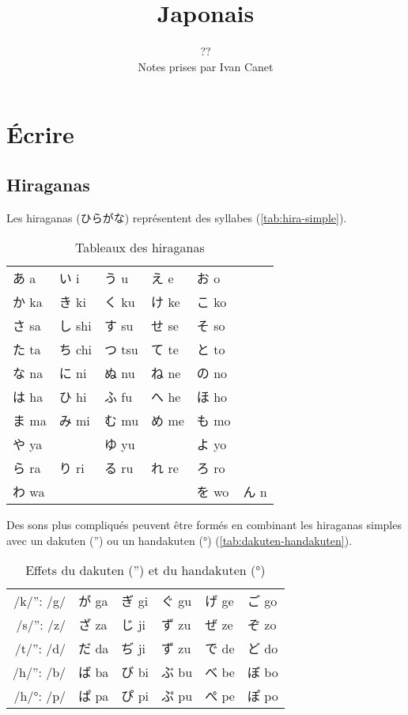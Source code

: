 \documentclass[a4paper,10pt,french,openany]{memoir}
\title{Japonais}
\author{??\\Notes prises par Ivan Canet}%
\begin{document}
\maketitle
\tableofcontents

\chapter{Écrire}
\section{Hiraganas}

Les hiraganas (ひらがな) représentent des syllabes (\autoref{tab:hira-simple}).

\begin{table}[htbp]
 \centering
 \begin{tabular}{llllll}
  あ a  & い i  & う u  & え e  & お o  &\\
  か ka & き ki & く ku & け ke & こ ko &\\
  さ sa & し shi& す su & せ se & そ so &\\
  た ta & ち chi& つ tsu& て te & と to &\\
  な na & に ni & ぬ nu & ね ne & の no &\\
  は ha & ひ hi & ふ fu & へ he & ほ ho &\\
  ま ma & み mi & む mu & め me & も mo &\\
  や ya & 　    & ゆ yu &　     & よ yo &\\
  ら ra & り ri & る ru & れ re & ろ ro &\\
  わ wa & 　    & 　    & 　    & を wo & ん n\\
 \end{tabular}
 \caption{Tableaux des hiraganas}
 \label{tab:hira-simple}
\end{table}

Des sons plus compliqués peuvent être formés en combinant les hiraganas simples avec un dakuten ('') ou un handakuten (°) (\autoref{tab:dakuten-handakuten}).

\begin{table}[htbp]
 \centering
 \begin{tabular}{r|lllll}
  /k/'': /g/ & が ga & ぎ gi & ぐ gu & げ ge & ご go \\
  /s/'': /z/ & ざ za & じ ji & ず zu & ぜ ze & ぞ zo \\
  /t/'': /d/ & だ da & ぢ ji & ず zu & で de & ど do \\
  /h/'': /b/ & ば ba & び bi & ぶ bu & べ be & ぼ bo \\
  /h/°: /p/  & ぱ pa & ぴ pi & ぷ pu & ぺ pe & ぽ po \\
 \end{tabular}
 \caption{Effets du dakuten ('') et du handakuten (°)}
 \label{tab:dakuten-handakuten}
\end{table}
\end{document}
